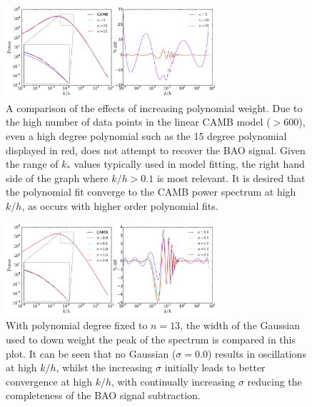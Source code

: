 \documentclass[a4paper,fleqn,usenatbib]{mnras}
\begin{document}
	
	\begin{figure}
		\begin{center}
			\includegraphics[width=0.7\textwidth]{ApolyDegree.pdf}
			\caption{A comparison of the effects of increasing polynomial weight. Due to the high number of data points in the linear CAMB model ($>600$), even a high degree polynomial such as the 15 degree polynomial displayed in red, does not attempt to recover the BAO signal. Given the range of $k_*$ values typically used in model fitting, the right hand side of the graph where $k/h > 0.1$ is most relevant. It is desired that the polynomial fit converge to the CAMB power spectrum at high $k/h$, as occurs with higher order polynomial fits.}
			\label{fig:ApolyDegree}
		\end{center}
	\end{figure}
	\begin{figure}
		\begin{center}
			\includegraphics[width=0.7\textwidth]{ApolySigma.pdf}
			\caption{With polynomial degree fixed to $n = 13$, the width of the Gaussian used to down weight the peak of the spectrum is compared in this plot. It can be seen that no Gaussian ($\sigma= 0.0$) results in oscillations at high $k/h$, whilst the increasing $\sigma$ initially leads to better convergence at high $k/h$, with continually increasing $\sigma$ reducing the completeness of the BAO signal subtraction.}
			\label{fig:ApolySigma}
		\end{center}
	\end{figure}
\end{document}
